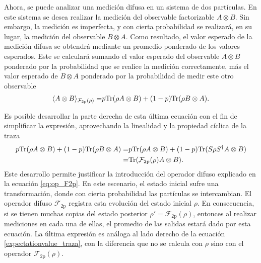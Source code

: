 

Ahora, se puede analizar una medición difusa en un sistema
de dos partículas. En este sistema se desea realizar la medición del observable factorizable $A\otimes B$. Sin embargo, la medición es imperfecta, y con cierta probabilidad se realizará, en su lugar, la medición del observable $B\otimes A$. Como resultado, el valor esperado de la medición difusa se obtendrá mediante un promedio ponderado de los valores esperados. Este se calculará sumando el valor esperado del observable $A\otimes B$ ponderado por la probabilidad que se realice la medición correctamente, más el valor esperado de $B\otimes A$ ponderado por la probabilidad de medir este otro observable {\cite{Pineda_2021}}\begin{equation}\label{eq:Expected-Value-FM-2p}
    \begin{split}
        \langle {A\otimes B}\rangle_{\mathcal{F}_{2\text{p}}(\rho)}=& p{\rm Tr}(\rho A\otimes B)+(1-p){\rm Tr}(\rho B\otimes A).\\
    \end{split}
\end{equation}

%
Es posible desarrollar la parte derecha de esta última ecuación con el fin de simplificar la expresión, aprovechando la linealidad y la propiedad cíclica de la traza \begin{equation}\label{eq:Expected-Value-FM-2p-desarrollo}
    \begin{split}
         p{\rm Tr}(\rho A\otimes B)+(1-p){\rm Tr}(\rho B\otimes A)
        =&p{\rm Tr}(\rho A\otimes B)+(1-p){\rm Tr}(S\rho S^\dagger A\otimes B)\\
        =&{\rm Tr}(\mathcal{F}_{2\text{p}}(\rho)A\otimes B).\\
    \end{split}
\end{equation} Este desarrollo permite justificar la introducción del operador difuso explicado en la ecuación {\eqref{eq:op_F2p}}. En este escenario, el estado inicial sufre una transformación, donde  con cierta probabilidad las partículas se intercambian. El operador difuso $\mathcal{F}_{2\text{p}}$ registra esta evolución del estado inicial $\rho$. En consecuencia, si se tienen muchas copias del estado posterior $\rho'=\mathcal{F}_{2\text{p}}(\rho)$, entonces al realizar mediciones en cada una de ellas, el promedio de las salidas estará dado por esta ecuación.  La última expresión es análoga al lado derecho de la ecuación {\eqref{expectationvalue_traza}}, con la diferencia que no se calcula con $\rho$ sino con el operador $\mathcal{F}_{2\text{p}}(\rho)$.



